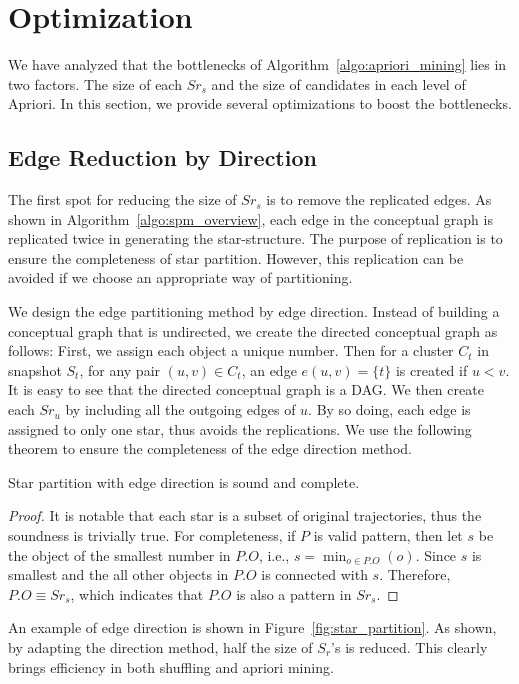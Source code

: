 \section{Optimization}
\label{sec:optimization}
We have analyzed that the bottlenecks of Algorithm~\ref{algo:apriori_mining} 
lies in two factors. The size of each $Sr_s$ and the size of candidates in each level of Apriori.
In this section, we provide several optimizations to boost the bottlenecks.

\subsection{Edge Reduction by Direction}
The first spot for reducing the size of $Sr_s$ is to remove the replicated edges. As shown in Algorithm~\ref{algo:spm_overview}, each edge in the conceptual graph is replicated twice in generating the star-structure. The purpose of replication is to ensure the completeness of star partition. However, this replication can be avoided if we choose an appropriate way of partitioning. 

We design the edge partitioning method by edge direction. Instead of building a conceptual graph that is undirected, we create the directed conceptual graph as follows: First, we assign each object a unique number. Then
for a cluster $C_t$ in snapshot $S_t$, for any pair $(u,v) \in C_t$, an edge $e(u,v) = \{t\}$ is created if $u < v$. It is easy to see that the directed conceptual graph is a DAG. We then create each $Sr_u$ by including all the outgoing edges of $u$. By so doing, each edge is assigned to only one star, thus avoids the replications. We use the following theorem to ensure the completeness of the edge direction method.

\begin{theorem}
Star partition with edge direction is sound and complete.
\end{theorem}
\begin{proof}
It is notable that each star is a subset of original trajectories, thus the soundness is trivially true. For completeness, if $P$ is valid pattern, then let $s$ be the object of the smallest number in $P.O$, i.e., $s=\min_{o \in P.O}(o)$. Since $s$ is smallest and the all other objects in $P.O$ is connected with $s$. Therefore, $P.O \equiv Sr_s$, which indicates that $P.O$ is also a pattern in $Sr_s$.
\end{proof}
An example of edge direction is shown in Figure~\ref{fig:star_partition}. As shown,
by adapting the direction method, half the size of $S_r$'s is reduced. This clearly brings efficiency in both shuffling and apriori mining.


